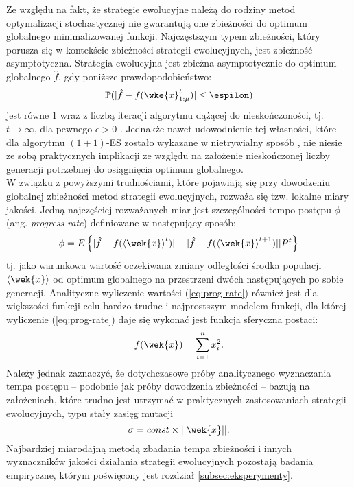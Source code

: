     Ze względu na fakt, że strategie ewolucyjne należą do rodziny metod optymalizacji stochastycznej nie gwarantują one zbieżności do optimum globalnego minimalizowanej funkcji.
    Najczęstszym typem zbieżności, który porusza się w kontekście zbieżności strategii ewolucyjnych, jest zbieżność asymptotyczna. Strategia ewolucyjna jest zbieżna asymptotycznie do optimum globalnego $\hat f$, gdy poniższe prawdopodobieństwo:
    \begin{equation*}
        \mathbb{P}(|\hat{f} - f(\wke{x}^{t}_{1:\mu})| \leq \espilon)
    \end{equation*}
    jest równe 1 wraz z liczbą iteracji algorytmu dążącej do nieskończoności, tj. $t \rightarrow \infty$, dla pewnego $\epsilon >0$ \cite{Kramer:2008}.
    Jednakże nawet udowodnienie tej własności, które dla algorytmu $(1+1)$-ES zostało wykazane w nietrywialny sposób \cite{Rechenberg:1973}, nie niesie ze sobą praktycznych implikacji ze względu na założenie nieskończonej liczby generacji potrzebnej do osiągnięcia optimum globalnego.\\
    W związku z powyższymi trudnościami, które pojawiają się przy dowodzeniu globalnej zbieżności metod strategii ewolucyjnych, rozważa się tzw. lokalne miary jakości. Jedną najczęściej rozważanych miar jest  szczególności tempo postępu $\phi$ (ang. \textit{progress rate}) definiowane w następujący sposób: 
    \begin{equation}
        \label{eq:prog-rate}
        \phi = E\left\{|\hat{f} - f(\left<\wek{x}\right>^{t})| - |\hat{f} - f(\left<\wek{x}\right>^{t+1})| |P^{t} \right\}
    \end{equation}
    tj. jako warunkowa wartość oczekiwana zmiany odległości środka populacji $\left<\wek{x}\right>$ od optimum globalnego na przestrzeni dwóch następujących po sobie generacji. Analityczne wyliczenie wartości (\ref{eq:prog-rate}) również jest dla większości funkcji celu bardzo trudne i najprostszym modelem funkcji, dla której wyliczenie (\ref{eq:prog-rate}) daje się wykonać jest funkcja sferyczna postaci:
    \begin{equation*}
        f(\wek{x}) = \sum^{n}_{i = 1}x^{2}_{i}.
    \end{equation*}
    Należy jednak zaznaczyć, że dotychczasowe próby analitycznego wyznaczania tempa postępu -- podobnie jak próby dowodzenia zbieżności -- bazują na założeniach, które trudno jest utrzymać w praktycznych zastosowaniach strategii ewolucyjnych, typu stały zasięg mutacji
    \begin{equation*}
        \sigma = const\times||\wek{x}||.
    \end{equation*}
    Najbardziej miarodajną metodą zbadania tempa zbieżności  i innych wyznaczników jakości działania strategii ewolucyjnych pozostają badania empiryczne, którym poświęcony jest rozdział \ref{subsec:eksperymenty}. 
